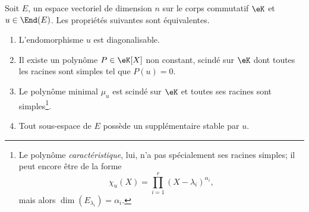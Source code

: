 \begin{theorem}     \label{ThoDigLEQEXR}
    Soit \( E\), un espace vectoriel de dimension \( n\) sur le corps commutatif \( \eK\) et \( u\in\End(E)\). Les propriétés suivantes sont équivalentes.
    \begin{enumerate}
        \item\label{ItemThoDigLEQEXRiv}
            L'endomorphisme \( u\) est diagonalisable.
        \item       \label{ItemThoDigLEQEXRi}
            Il existe un polynôme \( P\in\eK[X]\) non constant, scindé sur \(\eK\) dont toutes les racines sont simples tel que \( P(u)=0\).
        \item\label{ItemThoDigLEQEXRii}
            Le polynôme minimal \( \mu_u\) est scindé sur \(\eK\) et toutes ses racines sont simples\footnote{Le polynôme \emph{caractéristique}, lui, n'a pas spécialement ses racines simples; il peut encore être de la forme
            \begin{equation}
                \chi_u(X)=\prod_{i=1}^r(X-\lambda_i)^{\alpha_i},
        \end{equation}
        mais alors \( \dim(E_{\lambda_i})=\alpha_i\). }.
        \item\label{ItemThoDigLEQEXRiii}
            Tout sous-espace de \( E\) possède un supplémentaire stable par \( u\).
    \end{enumerate}
\end{theorem}

